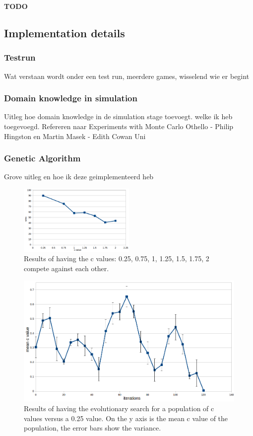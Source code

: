 \documentclass[10pt,letterpaper]{article}
\begin{document}
\textbf{TODO}
\pagebreak[4]
\subsection{Implementation details}
\subsubsection{Testrun}
Wat verstaan wordt onder een test run, meerdere games, wisselend wie er begint
\subsubsection{Domain knowledge in simulation}
Uitleg hoe domain knowledge in de simulation stage toevoegt. welke ik heb toegevoegd. Refereren naar Experiments with Monte Carlo Othello - Philip Hingston en Martin Masek - Edith Cowan Uni
\subsubsection{Genetic Algorithm}
Grove uitleg en hoe ik deze geimplementeerd heb

\begin{figure}
    \includegraphics[width=0.5\textwidth]{images/rank-fixed-c-values}
    \caption{Results of having the c values: 0.25, 0.75, 1, 1.25, 1.5, 1.75, 2 compete against each other.}
    \label{fig:results-fixed-rank}
\end{figure}
\begin{figure}
    \includegraphics[width=\textwidth]{images/evo-search}
    \caption{Results of having the evolutionary search for a population of c values versus a 0.25 value. On the y axis is the mean c value of the population, the error bars show the variance.}
    \label{fig:results-evo-search}
\end{figure}
\end{document}
